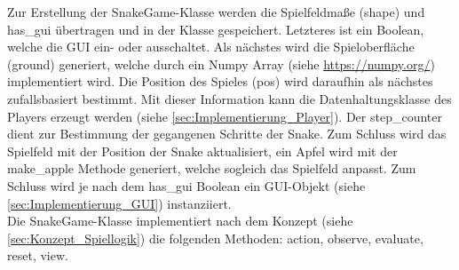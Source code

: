 Zur Erstellung der SnakeGame-Klasse werden die Spielfeldmaße (shape) und has\_gui übertragen und in der Klasse gespeichert. Letzteres ist ein Boolean, welche die GUI ein- oder ausschaltet. Als nächstes wird die Spieloberfläche (ground) generiert, welche durch ein Numpy Array (siehe \url{https://numpy.org/}) implementiert wird. Die Position des Spieles (pos) wird daraufhin als nächstes zufallsbasiert bestimmt. Mit dieser Information kann die Datenhaltungsklasse des Players erzeugt werden (siehe \ref{sec:Implementierung_Player}). Der step\_counter dient zur Bestimmung der gegangenen Schritte der Snake. Zum Schluss wird das Spielfeld mit der Position der Snake aktualisiert, ein Apfel wird mit der make\_apple Methode generiert, welche sogleich das Spielfeld anpasst. Zum Schluss wird je nach dem has\_gui Boolean ein GUI-Objekt (siehe \ref{sec:Implementierung_GUI}) instanziiert.\\
Die SnakeGame-Klasse implementiert nach dem Konzept (siehe \ref{sec:Konzept_Spiellogik}) die folgenden Methoden: action, observe, evaluate, reset, view.

